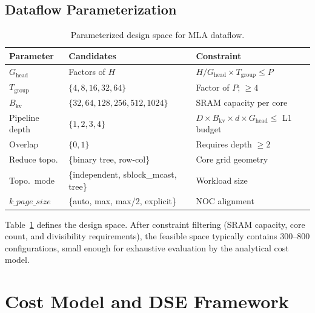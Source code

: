 \documentclass[sigconf, review, anonymous]{acmart}
\newcommand{\Bkv}{B_{\mathrm{kv}}}
\newcommand{\Ghead}{G_{\mathrm{head}}}
\newcommand{\Tgroup}{T_{\mathrm{group}}}
\begin{document}

\subsection{Dataflow Parameterization}\label{sec:design-param}

\begin{table}[t]
  \caption{Parameterized design space for MLA dataflow.}
  \label{tab:design-space}
  \centering\small
  \begin{tabular}{llp{4.2cm}}
    \toprule
    \textbf{Parameter} & \textbf{Candidates} & \textbf{Constraint} \\
    \midrule
    $\Ghead$ & Factors of $H$ &
      $H/\Ghead \times \Tgroup \leq P$ \\
    $\Tgroup$ & $\{4, 8, 16, 32, 64\}$ &
      Factor of $P$; $\geq 4$ \\
    $\Bkv$ & $\{32, 64, 128, 256, 512, 1024\}$ &
      SRAM capacity per core \\
    Pipeline depth & $\{1, 2, 3, 4\}$ &
      $D \times \Bkv \times d \times \Ghead \leq$ L1 budget \\
    Overlap & $\{0, 1\}$ &
      Requires depth $\geq 2$ \\
    Reduce topo. & \{binary tree, row-col\} &
      Core grid geometry \\
    Topo.\ mode & \{independent, sblock\_mcast, tree\} &
      Workload size \\
    $k\_page\_size$ & \{auto, max, max/2, explicit\} &
      NOC alignment \\
    \bottomrule
  \end{tabular}
\end{table}

Table~\ref{tab:design-space} defines the design space.
After constraint filtering (SRAM capacity, core count, and
divisibility requirements), the feasible space typically contains
300--800 configurations, small enough for exhaustive evaluation
by the analytical cost model.


\section{Cost Model and DSE Framework}\label{sec:costmodel}
\end{document}
